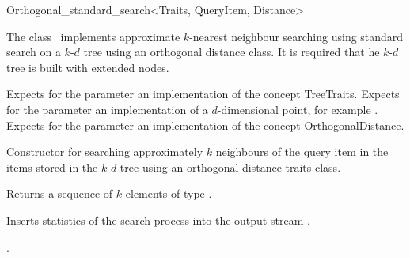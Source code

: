 

\begin{ccRefClass}{Orthogonal_standard_search<Traits, QueryItem, Distance>}  %


\ccDefinition

The class \ccRefName\ implements approximate $k$-nearest neighbour searching
using standard search on a $k$-$d$ tree using an orthogonal distance
class. It is required that he $k$-$d$ tree is built with extended nodes.


\ccParameters

Expects for the parameter  an implementation of the concept TreeTraits.
Expects for the parameter   an implementation
of a $d$-dimensional point, for example .
Expects for the parameter  an implementation of the
concept OrthogonalDistance.

\ccTypes



\ccCreation
{}  %

{Constructor for searching approximately $k$ neighbours of the query item 
in the items stored in the $k$-$d$ tree  using an orthogonal distance
traits class.}


{Returns a sequence of $k$ elements of type }.


{
Inserts statistics of the search process into the output stream .
}


\ccSeeAlso

.

\end{ccRefClass}


